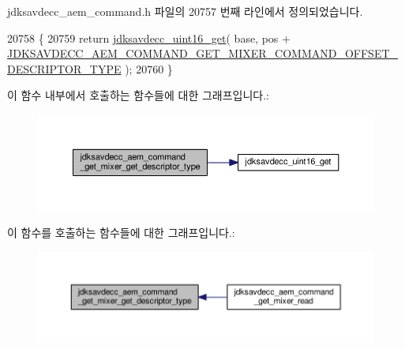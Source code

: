 jdksavdecc\+\_\+aem\+\_\+command.\+h 파일의 20757 번째 라인에서 정의되었습니다.


\begin{DoxyCode}
20758 \{
20759     \textcolor{keywordflow}{return} \hyperlink{group__endian_ga3fbbbc20be954aa61e039872965b0dc9}{jdksavdecc\_uint16\_get}( base, pos + 
      \hyperlink{group__command__get__mixer_ga87945d74b44059916b1722a74cbf5cbd}{JDKSAVDECC\_AEM\_COMMAND\_GET\_MIXER\_COMMAND\_OFFSET\_DESCRIPTOR\_TYPE}
       );
20760 \}
\end{DoxyCode}


이 함수 내부에서 호출하는 함수들에 대한 그래프입니다.\+:
\nopagebreak
\begin{figure}[H]
\begin{center}
\leavevmode
\includegraphics[width=350pt]{group__command__get__mixer_ga78a91c078980c39650c6d42d8f332793_cgraph}
\end{center}
\end{figure}




이 함수를 호출하는 함수들에 대한 그래프입니다.\+:
\nopagebreak
\begin{figure}[H]
\begin{center}
\leavevmode
\includegraphics[width=350pt]{group__command__get__mixer_ga78a91c078980c39650c6d42d8f332793_icgraph}
\end{center}
\end{figure}


